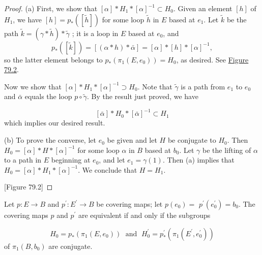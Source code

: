 \begin{proof}
	(a) First, we show that \([ \alpha ] * H_{1} * {[ \alpha ] }^{-1} \subset {H}_{0}\). Given an element \([ h]\) of \(H_{1}\), we have \([ h] = p_{ * }( [ \widetilde{h}] )\) for some loop \(\widetilde{h}\) in \(E\) based at \(e_{1}\). Let \(\widetilde{k}\) be the path \(\widetilde{k} = ( {\gamma * \widetilde{h}}) * \widetilde{\gamma }\) ; it is a loop in \(E\) based at \(e_{0}\), and
\[
p_{ * }( [ \widetilde{k}] ) = [ {( {\alpha * h}) * \bar{\alpha }}] = [ \alpha ] * [ h] * {[ \alpha ] }^{-1},
\]
so the latter element belongs to \(p_{ * }( {{\pi }_{1}( {E,e_{0}}) }) = H_{0}\), as desired. See \hyperref[fig:79.2]{Figure 79.2}.

Now we show that \([ \alpha ] * H_{1} * {[ \alpha ] }^{-1} \supset {H}_{0}\). Note that \(\widetilde{\gamma }\) is a path from \(e_{1}\) to \(e_{0}\) and \(\bar{\alpha }\) equals the loop \(p \circ \widetilde{\gamma }\). By the result just proved, we have

\[
[ \bar{\alpha }] * H_{0} * {[ \bar{\alpha }] }^{-1} \subset {H}_{1}
\]
which implies our desired result.

(b) To prove the converse, let \(e_{0}\) be given and let \(H\) be conjugate to \(H_{0}\). Then \(H_{0} = [ \alpha ] * H * {[ \alpha ] }^{-1}\) for some loop \(\alpha\) in \(B\) based at \(b_{0}\). Let \(\gamma\) be the lifting of \(\alpha\) to a path in \(E\) beginning at \(e_{0}\), and let \(e_{1} = \gamma (1)\). Then (a) implies that \(H_{0} = [ \alpha ] * H_{1} * {[ \alpha ] }^{-1}\). We conclude that \(H = H_{1}\).

[Figure 79.2]
\end{proof}
\begin{theorem}
\label{thm:\thetheorem}
	Let \(p : E \rightarrow B\) and \(p^{\prime } : E^{\prime } \rightarrow B\) be covering maps; let \(p( e_{0}) =\) \(p^{\prime }( e_0^{\prime }) = b_{0}\). The covering maps \(p\) and \(p^{\prime }\) are equivalent if and only if the subgroups

\[
H_{0} = p_{ * }( {{\pi }_{1}( {E,e_{0}}) }) \;\text{ and }\;H_0^{\prime } = p_{ * }^{\prime }( {{\pi }_{1}( {E^{\prime },e_0^{\prime }}) })
\]
of \({\pi }_{1}( {B,b_{0}})\) are conjugate.
\end{theorem}

